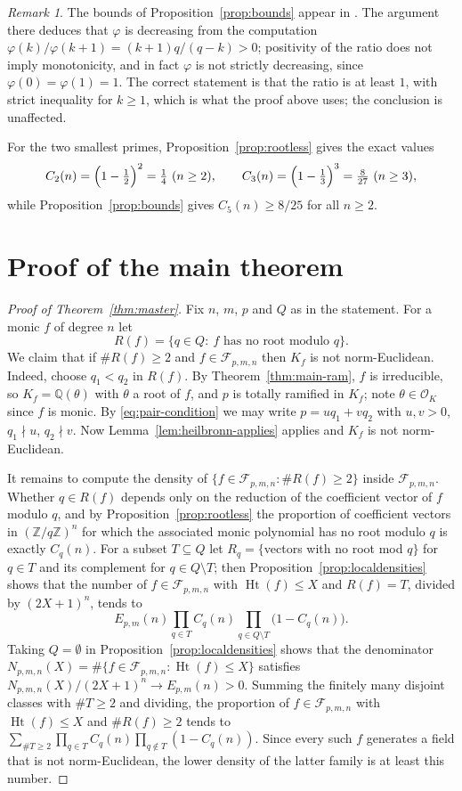\documentclass[11pt,reqno]{amsart}
\theoremstyle{plain}
\theoremstyle{definition}
\theoremstyle{remark}
\newtheorem{remark}[theorem]{Remark}
\newcommand{\Z}{\mathbb{Z}}
\newcommand{\Q}{\mathbb{Q}}
\newcommand{\OK}{\mathcal{O}_K}
\newcommand{\Ht}{\operatorname{Ht}}
\begin{document}
\begin{remark}
The bounds of Proposition~\ref{prop:bounds} appear in \cite{HMT}. The argument there deduces that
$\varphi$ is decreasing from the computation $\varphi(k)/\varphi(k+1)=(k+1)q/(q-k)>0$; positivity
of the ratio does not imply monotonicity, and in fact $\varphi$ is not strictly decreasing, since
$\varphi(0)=\varphi(1)=1$. The correct statement is that the ratio is at least $1$, with strict
inequality for $k\ge1$, which is what the proof above uses; the conclusion is unaffected.
\end{remark}

For the two smallest primes, Proposition~\ref{prop:rootless} gives the exact values
\[
  C_2(n)=\Bigl(1-\tfrac12\Bigr)^2=\tfrac14\ (n\ge2),\qquad
  C_3(n)=\Bigl(1-\tfrac13\Bigr)^3=\tfrac{8}{27}\ (n\ge3),
\]
while Proposition~\ref{prop:bounds} gives $C_5(n)\ge 8/25$ for all $n\ge2$.

\section{Proof of the main theorem}\label{sec:proof}

\begin{proof}[Proof of Theorem~\ref{thm:master}]
Fix $n$, $m$, $p$ and $Q$ as in the statement. For a monic $f$ of degree $n$ let
\[
  R(f)=\{q\in Q:\ f \text{ has no root modulo } q\}.
\]
We claim that if $\#R(f)\ge2$ and $f\in\mathcal F_{p,m,n}$ then $K_f$ is not norm-Euclidean.
Indeed, choose $q_1<q_2$ in $R(f)$. By Theorem~\ref{thm:main-ram}, $f$ is irreducible, so
$K_f=\Q(\theta)$ with $\theta$ a root of $f$, and $p$ is totally ramified in $K_f$; note
$\theta\in\OK$ since $f$ is monic. By \eqref{eq:pair-condition} we may write
$p=uq_1+vq_2$ with $u,v>0$, $q_1\nmid u$, $q_2\nmid v$. Now Lemma~\ref{lem:heilbronn-applies}
applies and $K_f$ is not norm-Euclidean.

It remains to compute the density of $\{f\in\mathcal F_{p,m,n}: \#R(f)\ge2\}$ inside
$\mathcal F_{p,m,n}$. Whether $q\in R(f)$ depends only on the reduction of the coefficient vector
of $f$ modulo $q$, and by Proposition~\ref{prop:rootless} the proportion of coefficient vectors in
$(\Z/q\Z)^n$ for which the associated monic polynomial has no root modulo $q$ is exactly $C_q(n)$.
For a subset $T\subseteq Q$ let $R_q=\{$vectors with no root mod $q\}$ for $q\in T$ and its
complement for $q\in Q\setminus T$; then Proposition~\ref{prop:localdensities} shows that the
number of $f\in\mathcal F_{p,m,n}$ with $\Ht(f)\le X$ and $R(f)=T$, divided by $(2X+1)^n$, tends to
\[
  E_{p,m}(n)\prod_{q\in T}C_q(n)\prod_{q\in Q\setminus T}\bigl(1-C_q(n)\bigr).
\]
Taking $Q=\emptyset$ in Proposition~\ref{prop:localdensities} shows that the denominator
$N_{p,m,n}(X)=\#\{f\in\mathcal F_{p,m,n}:\Ht(f)\le X\}$ satisfies
$N_{p,m,n}(X)/(2X+1)^n\to E_{p,m}(n)>0$. Summing the finitely many disjoint classes with $\#T\ge2$
and dividing, the proportion of $f\in\mathcal F_{p,m,n}$ with $\Ht(f)\le X$ and $\#R(f)\ge2$ tends
to $\sum_{\#T\ge2}\prod_{q\in T}C_q(n)\prod_{q\notin T}(1-C_q(n))$. Since every such $f$ generates
a field that is not norm-Euclidean, the lower density of the latter family is at least this
number.
\end{proof}
\end{document}
